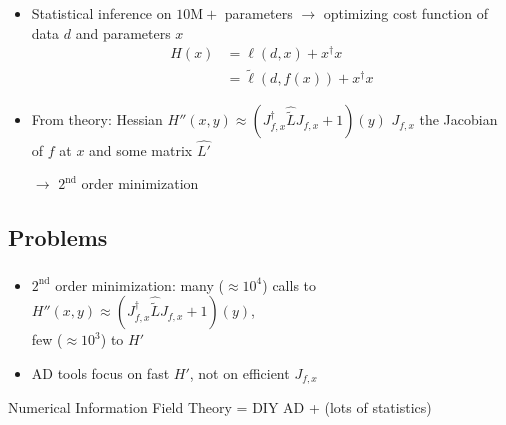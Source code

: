 \documentclass[aspectratio=169,xcolor=dvipsnames]{beamer}
\begin{document}
\begin{frame}
	\frametitle{\insertsection}
	\framesubtitle{\insertsubsection}

	\begin{itemize}
		\item Statistical inference on $10\mathrm{M}+$ parameters $\rightarrow$ optimizing cost function of data $d$ and parameters $x$
		\begin{align*}
			H(x) &= \ell(d, x) + x^\dagger x
			\\ &= \tilde{\ell}(d, f(x)) + x^\dagger x
		\end{align*}
		\pause
		\item From theory: Hessian $H''(x, y) \approx (J_{f,x}^\dagger \widehat{\tilde{L}} J_{f,x} + 1)(y)$ {\tiny\color{gray}$J_{f,x}$ the Jacobian of $f$ at $x$ and some matrix $\hat{L'}$}
		\pause
		\item[$\rightarrow$] $2^\text{nd}$ order minimization
	\end{itemize}

\end{frame}

\subsection{Problems}  %
\begin{frame}
	\frametitle{\insertsection}
	\framesubtitle{\insertsubsection}

	\begin{itemize}
		\item $2^\text{nd}$ order minimization: many ($\approx10^4$) calls to $H''(x, y) \approx (J_{f,x}^\dagger \widehat{\tilde{L}} J_{f,x} + 1)(y)$,
		\\ few ($\approx10^3$) to $H'$
		\pause
		\item AD tools focus on fast $H'$, not on efficient $J_{f,x}$
	\end{itemize}

	\pause
	\begin{center}
		Numerical Information Field Theory = DIY AD + (lots of statistics)
	\end{center}

\end{frame}
\end{document}
